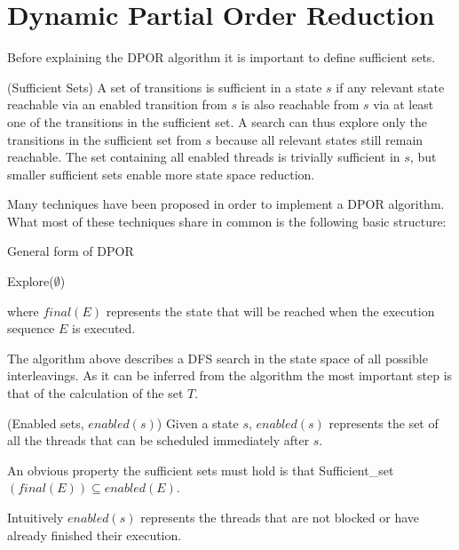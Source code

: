\section{Dynamic Partial Order Reduction}

Before explaining the DPOR algorithm it is important to define sufficient sets.

\begin{definition}{(Sufficient Sets)}
A set of transitions is sufficient in a state $s$ if any relevant
state reachable via an enabled transition from $s$ is also reachable from $s$ via at least one of the transitions in the sufficient
set. A search can thus explore only the transitions in the
sufficient set from $s$ because all relevant states still remain
reachable. The set containing all enabled threads is trivially
sufficient in $s$, but smaller sufficient sets enable more state
space reduction.
\end{definition}

Many techniques have been proposed in order to implement a DPOR algorithm. What most of these techniques share in common is the following basic structure:

\begin{algorithm}[H]
    \caption{General form of DPOR}
    Explore($\emptyset$)\;
\end{algorithm}

where $final(E)$ represents the state that will be reached when the execution sequence $E$ is executed.

The algorithm above describes a DFS search in the state space of all possible interleavings.
As it can be inferred from the algorithm the most important step is that of the calculation of the set $T$.

\begin{definition}{(Enabled sets, $enabled(s)$)}
    Given a state $s$, $enabled(s)$ represents the set of all the threads that can be scheduled immediately after $s$.
\end{definition}

An obvious property the sufficient sets must hold is that Sufficient\_set$(final(E)) \subseteq enabled(E)$.

Intuitively $enabled(s)$ represents the threads that are not blocked or have already finished their execution.

